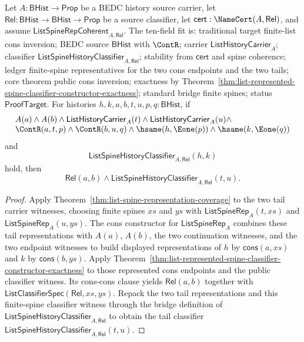 \begin{theorem}
\label{thm:list-public-classifier-cons-endpoint-inversion}
Let $A:\mathsf{BHist}\to\mathsf{Prop}$ be a BEDC history source carrier, let
$\mathsf{Rel}:\mathsf{BHist}\to\mathsf{BHist}\to\mathsf{Prop}$ be a source
classifier, let $\mathsf{cert}:\NameCert(A,\mathsf{Rel})$, and assume
$\mathsf{ListSpineRepCoherent}_{A,\mathsf{Rel}}$. The ten-field fit is:
traditional target finite-list cons inversion; BEDC source $\mathsf{BHist}$
with $\ContR$; carrier $\mathsf{ListHistoryCarrier}_A$; classifier
$\mathsf{ListSpineHistoryClassifier}_{A,\mathsf{Rel}}$; stability from
$\mathsf{cert}$ and spine coherence; ledger finite-spine representatives for
the two cons endpoints and the two tails; core theorem public cons inversion;
exactness by
Theorem~\ref{thm:list-represented-spine-classifier-constructor-exactness};
standard bridge finite spines; status $\mathsf{ProofTarget}$. For histories
$h,k,a,b,t,u,p,q:\mathsf{BHist}$, if
$$
\begin{array}{l}
A(a)\land A(b)\land
\mathsf{ListHistoryCarrier}_A(t)\land
\mathsf{ListHistoryCarrier}_A(u)\land\\
\ContR(a,t,p)\land \ContR(b,u,q)\land
\hsame(h,\Eone(p))\land \hsame(k,\Eone(q))
\end{array}
$$
and
$$
\mathsf{ListSpineHistoryClassifier}_{A,\mathsf{Rel}}(h,k)
$$
hold, then
$$
\mathsf{Rel}(a,b)\land
\mathsf{ListSpineHistoryClassifier}_{A,\mathsf{Rel}}(t,u).
$$
\end{theorem}
\begin{proof}
Apply Theorem~\ref{thm:list-spine-representation-coverage} to the two tail
carrier witnesses, choosing finite spines $xs$ and $ys$ with
$\mathsf{ListSpineRep}_A(t,xs)$ and $\mathsf{ListSpineRep}_A(u,ys)$. The cons
constructor for $\mathsf{ListSpineRep}_A$ combines these tail representations
with $A(a)$, $A(b)$, the two continuation witnesses, and the two endpoint
witnesses to build displayed representations of $h$ by
$\mathsf{cons}(a,xs)$ and $k$ by $\mathsf{cons}(b,ys)$. Apply
Theorem~\ref{thm:list-represented-spine-classifier-constructor-exactness} to
those represented cons endpoints and the public classifier witness. Its
cons-cons clause yields $\mathsf{Rel}(a,b)$ together with
$\mathsf{ListClassifierSpec}(\mathsf{Rel},xs,ys)$. Repack the two tail
representations and this finite-spine classifier witness through the bridge
definition of $\mathsf{ListSpineHistoryClassifier}_{A,\mathsf{Rel}}$ to obtain
the tail classifier $\mathsf{ListSpineHistoryClassifier}_{A,\mathsf{Rel}}(t,u)$.
\end{proof}

